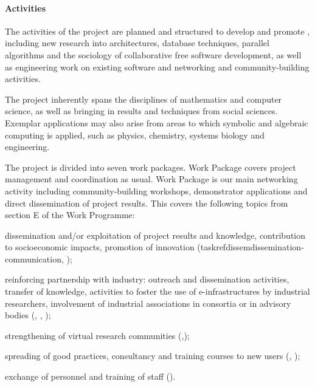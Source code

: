 \paragraph{Activities}

The activities of the project are planned and structured to develop
and promote \TheProject, including new research into
architectures, database techniques, parallel algorithms and the
sociology of collaborative free software development, as well as
engineering work on existing software and networking and
community-building activities.

The project inherently spans the disciplines of mathematics and
computer science, as well as bringing in results and techniques from
social sciences. Exemplar applications may also arise from areas to
which symbolic and algebraic computing is applied, such as physics,
chemistry, systems biology and engineering.


The project is divided into seven work packages. Work Package
 covers project management and coordination as
usual. Work Package  is our main networking activity
including community-building workshops, demonstrator applications and
direct dissemination of project results.
This covers the following topics from section E of the Work Programme:
\begin{compactitem}
\item dissemination and/or exploitation of project results and
  knowledge, contribution to socioeconomic impacts, promotion of
  innovation (taskref{dissem}{dissemination-communication},
  );
\item reinforcing partnership with industry: outreach and
  dissemination activities, transfer of knowledge, activities to
  foster the use of e-infrastructures by industrial researchers,
  involvement of industrial associations in consortia or in advisory
  bodies (,
  , );
\item strengthening of virtual research communities
  (,);
\item spreading of good practices, consultancy and training courses to
  new users (,
  );
\item exchange of personnel and training of staff
  ().
\end{compactitem}


